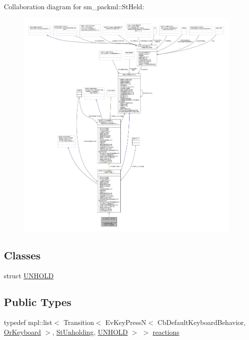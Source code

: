 Collaboration diagram for sm\+\_\+packml\+:\+:St\+Held\+:
\nopagebreak
\begin{figure}[H]
\begin{center}
\leavevmode
\includegraphics[width=350pt]{structsm__packml_1_1StHeld__coll__graph}
\end{center}
\end{figure}
\subsection*{Classes}
\begin{DoxyCompactItemize}
\item 
struct \hyperlink{structsm__packml_1_1StHeld_1_1UNHOLD}{U\+N\+H\+O\+LD}
\end{DoxyCompactItemize}
\subsection*{Public Types}
\begin{DoxyCompactItemize}
\item 
typedef mpl\+::list$<$ Transition$<$ Ev\+Key\+PressN$<$ Cb\+Default\+Keyboard\+Behavior, \hyperlink{classsm__packml_1_1OrKeyboard}{Or\+Keyboard} $>$, \hyperlink{structsm__packml_1_1StUnholding}{St\+Unholding}, \hyperlink{structsm__packml_1_1StHeld_1_1UNHOLD}{U\+N\+H\+O\+LD} $>$ $>$ \hyperlink{structsm__packml_1_1StHeld_a808a22c5c16ab47ef30db3c477b8d543}{reactions}
\end{DoxyCompactItemize}
